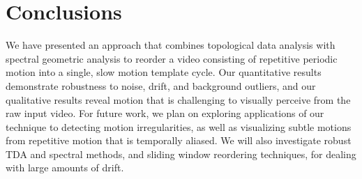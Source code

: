 \documentclass{article}
\begin{document}
\section{Conclusions}

We have presented an approach that combines topological data analysis with spectral geometric analysis to reorder a video consisting of repetitive periodic motion into a single, slow motion template cycle.
Our quantitative results demonstrate robustness to noise, drift, and background outliers, and our qualitative results reveal motion that is challenging to visually perceive from the raw input video.
For future work, we plan on exploring applications of our technique to detecting motion irregularities, as well as visualizing subtle motions from repetitive motion that is temporally aliased.
We will also investigate robust TDA and spectral methods, and sliding window reordering techniques, for dealing with large amounts of drift.




\end{document}
